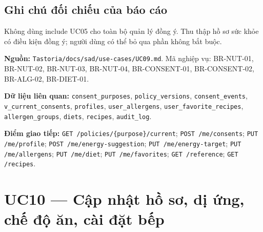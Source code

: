 \subsection{Ghi chú đối chiếu của báo cáo}
Không dùng include UC05 cho toàn bộ quản lý đồng ý. Thu thập hồ sơ sức khỏe có điều kiện đồng ý; người dùng có thể bỏ qua phần không bắt buộc.

\textbf{Nguồn:} {\small\texttt{Tastoria/\allowbreak{}\allowbreak{}docs/\allowbreak{}\allowbreak{}sad/\allowbreak{}\allowbreak{}use-\allowbreak{}cases/\allowbreak{}\allowbreak{}UC09.\allowbreak{}md}}. Mã nghiệp vụ: BR-\allowbreak{}NUT-\allowbreak{}01, BR-\allowbreak{}NUT-\allowbreak{}02, BR-\allowbreak{}NUT-\allowbreak{}03, BR-\allowbreak{}NUT-\allowbreak{}04, BR-\allowbreak{}CONSENT-\allowbreak{}01, BR-\allowbreak{}CONSENT-\allowbreak{}02, BR-\allowbreak{}ALG-\allowbreak{}02, BR-\allowbreak{}DIET-\allowbreak{}01.

\textbf{Dữ liệu liên quan:} {\small\texttt{consent\_\allowbreak{}\allowbreak{}purposes}}, {\small\texttt{policy\_\allowbreak{}\allowbreak{}versions}}, {\small\texttt{consent\_\allowbreak{}\allowbreak{}events}}, {\small\texttt{v\_\allowbreak{}\allowbreak{}current\_\allowbreak{}\allowbreak{}consents}}, {\small\texttt{profiles}}, {\small\texttt{user\_\allowbreak{}\allowbreak{}allergens}}, {\small\texttt{user\_\allowbreak{}\allowbreak{}favorite\_\allowbreak{}\allowbreak{}recipes}}, {\small\texttt{allergen\_\allowbreak{}\allowbreak{}groups}}, {\small\texttt{diets}}, {\small\texttt{recipes}}, {\small\texttt{audit\_\allowbreak{}\allowbreak{}log}}.

\textbf{Điểm giao tiếp:} {\small\texttt{GET /\allowbreak{}\allowbreak{}policies/\allowbreak{}\allowbreak{}\{purpose\}/\allowbreak{}\allowbreak{}current}}; {\small\texttt{POST /\allowbreak{}\allowbreak{}me/\allowbreak{}\allowbreak{}consents}}; {\small\texttt{PUT /\allowbreak{}\allowbreak{}me/\allowbreak{}\allowbreak{}profile}}; {\small\texttt{POST /\allowbreak{}\allowbreak{}me/\allowbreak{}\allowbreak{}energy-\allowbreak{}suggestion}}; {\small\texttt{PUT /\allowbreak{}\allowbreak{}me/\allowbreak{}\allowbreak{}energy-\allowbreak{}target}}; {\small\texttt{PUT /\allowbreak{}\allowbreak{}me/\allowbreak{}\allowbreak{}allergens}}; {\small\texttt{PUT /\allowbreak{}\allowbreak{}me/\allowbreak{}\allowbreak{}diet}}; {\small\texttt{PUT /\allowbreak{}\allowbreak{}me/\allowbreak{}\allowbreak{}favorites}}; {\small\texttt{GET /\allowbreak{}\allowbreak{}reference}}; {\small\texttt{GET /\allowbreak{}\allowbreak{}recipes}}.

\section{UC10 --- Cập nhật hồ sơ, dị ứng, chế độ ăn, cài đặt bếp}
